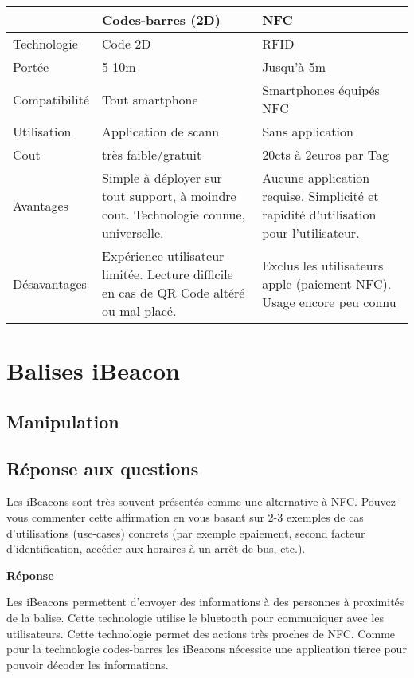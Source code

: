 \documentclass[francais,12pt]{article}
\begin{document}
	\begin{tabular}{|l|p{6cm}|p{6cm}|}
		\hline 
		\rowcolor{lightgray}& Codes-barres (2D) & NFC \\ 
		\hline 
		Technologie & Code 2D  & RFID  \\ 
		\hline 
		Portée & 5-10m  & Jusqu'à 5m \\ 
		\hline 
		Compatibilité & Tout smartphone  & Smartphones équipés NFC  \\ 
		\hline 
		Utilisation & Application de scann & Sans application \\ 
		\hline 
		Cout &  très faible/gratuit & 20cts à 2euros par Tag \\ 
		\hline 
		Avantages & Simple à déployer sur tout support, à moindre cout. Technologie connue, universelle.  & Aucune application requise. Simplicité et rapidité d'utilisation pour l'utilisateur. \\ 
		\hline 
		Désavantages & Expérience utilisateur limitée. Lecture difficile en cas de QR Code altéré ou mal placé. & Exclus les utilisateurs apple (paiement NFC). Usage encore peu connu \\ 
		\hline 
	\end{tabular} 
	
	\section*{Balises iBeacon}
	\subsection*{Manipulation}
	\subsection*{Réponse aux questions}
	Les iBeacons sont très souvent présentés comme une alternative à NFC. Pouvez-vous commenter cette affirmation en vous basant sur 2-3 exemples de cas d’utilisations (use-cases) concrets (par exemple epaiement, second facteur d’identification, accéder aux horaires à un arrêt de bus, etc.). 

	{\color[rgb]{0,0.5,0.23}\textbf{Réponse}}
	
	Les iBeacons permettent d'envoyer des informations à des personnes à proximités de la balise. Cette technologie utilise le bluetooth pour communiquer avec les utilisateurs. Cette technologie permet des actions très proches de NFC. Comme pour la technologie codes-barres les iBeacons nécessite une application tierce pour pouvoir décoder les informations.
	
\end{document}
